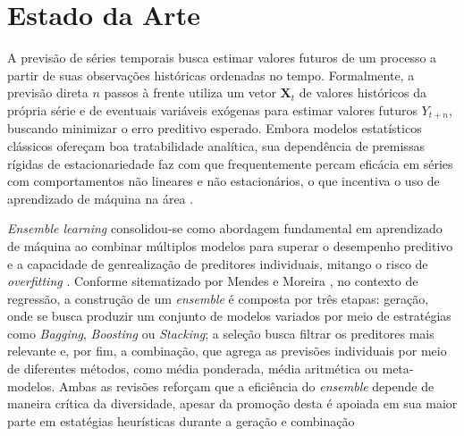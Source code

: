 \chapter{Estado da Arte}

A previsão de séries temporais busca estimar valores futuros de um processo a partir de suas observações históricas ordenadas no tempo. Formalmente, a previsão direta $n$ passos à frente utiliza um vetor $\mathbf{X}_t$ de valores históricos da própria série e de eventuais variáveis exógenas para estimar valores futuros $Y_{t+n}$, buscando minimizar o erro preditivo esperado. Embora modelos estatísticos clássicos ofereçam boa tratabilidade analítica, sua dependência de premissas rígidas de estacionariedade faz com que frequentemente percam eficácia em séries com comportamentos não lineares e não estacionários, o que incentiva o uso de aprendizado de máquina na área \cite{masiniMachineLearningAdvances2021}.  

\textit{Ensemble learning} consolidou-se como abordagem fundamental em aprendizado de máquina ao combinar múltiplos modelos para superar o desempenho preditivo e a capacidade de genrealização de preditores individuais, mitango o risco de \textit{overfitting} \cite{fanDiverseModelsUnited2025}.
Conforme sitematizado por Mendes e Moreira \cite{mendes-moreiraEnsembleApproachesRegression2012}, no contexto de regressão, a construção de um \textit{ensemble} é composta por três etapas: geração, onde se busca produzir um conjunto de modelos variados por meio de estratégias como \textit{Bagging}, \textit{Boosting} ou \textit{Stacking}; a seleção busca filtrar os preditores mais relevante e, por fim, a combinação, que agrega as previsões individuais por meio de diferentes métodos, como média ponderada, média aritmética ou meta-modelos. Ambas as revisões reforçam que a eficiência do \textit{ensemble} depende de maneira crítica da diversidade, apesar da promoção desta é apoiada em sua maior parte em estatégias heurísticas durante a geração e combinação \cite{fanDiverseModelsUnited2025, mendes-moreiraEnsembleApproachesRegression2012}

